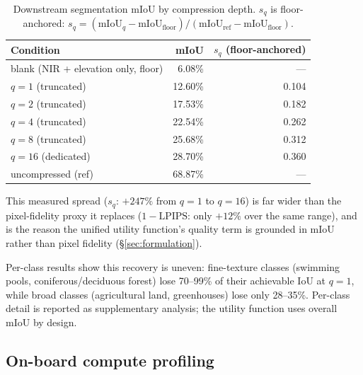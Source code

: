 \begin{table}[h]
\centering
\caption{Downstream segmentation mIoU by compression depth. $s_q$ is
floor-anchored: $s_q = (\text{mIoU}_q - \text{mIoU}_{\text{floor}}) /
(\text{mIoU}_{\text{ref}} - \text{mIoU}_{\text{floor}})$.}
\label{tab:downstream}
\begin{tabular}{lrr}
\toprule
Condition & mIoU & $s_q$ (floor-anchored) \\
\midrule
blank (NIR + elevation only, floor) & 6.08\% & --- \\
$q=1$ (truncated)  & 12.60\% & 0.104 \\
$q=2$ (truncated)  & 17.53\% & 0.182 \\
$q=4$ (truncated)  & 22.54\% & 0.262 \\
$q=8$ (truncated)  & 25.68\% & 0.312 \\
$q=16$ (dedicated) & 28.70\% & 0.360 \\
uncompressed (ref) & 68.87\% & --- \\
\bottomrule
\end{tabular}
\end{table}

This measured spread ($s_q$: $+247\%$ from $q=1$ to $q=16$) is far wider
than the pixel-fidelity proxy it replaces ($1-\text{LPIPS}$: only $+12\%$
over the same range), and is the reason the unified utility function's
quality term is grounded in mIoU rather than pixel fidelity
(\S\ref{sec:formulation}).

Per-class results show this recovery is uneven: fine-texture classes
(swimming pools, coniferous/deciduous forest) lose 70--99\% of their
achievable IoU at $q=1$, while broad classes (agricultural land,
greenhouses) lose only 28--35\%. Per-class detail is reported as
supplementary analysis; the utility function uses overall mIoU by design.


\subsection{On-board compute profiling}

